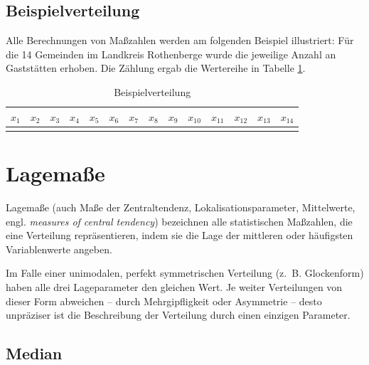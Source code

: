 \documentclass[
  11pt,
  ngerman,
  a4paper,
]{report}
\begin{document}
\hypertarget{beispielverteilung}{%
\subsection{Beispielverteilung}\label{beispielverteilung}}

Alle Berechnungen von Maßzahlen werden am folgenden Beispiel illustriert: Für die 14 Gemeinden im Landkreis Rothenberge wurde die jeweilige Anzahl an Gaststätten erhoben. Die Zählung ergab die Wertereihe in Tabelle \ref{tab:werte}.

\begin{table}

\caption{\label{tab:werte}Beispielverteilung}
\centering
\begin{tabular}[t]{rrrrrrrrrrrrrr}
\toprule
\textbf{$x_{1}$} & \textbf{$x_{2}$} & \textbf{$x_{3}$} & \textbf{$x_{4}$} & \textbf{$x_{5}$} & \textbf{$x_{6}$} & \textbf{$x_{7}$} & \textbf{$x_{8}$} & \textbf{$x_{9}$} & \textbf{$x_{10}$} & \textbf{$x_{11}$} & \textbf{$x_{12}$} & \textbf{$x_{13}$} & \textbf{$x_{14}$}\\
\midrule
\cellcolor{gray!6}{4} & \cellcolor{gray!6}{1} & \cellcolor{gray!6}{4} & \cellcolor{gray!6}{1} & \cellcolor{gray!6}{5} & \cellcolor{gray!6}{5} & \cellcolor{gray!6}{0} & \cellcolor{gray!6}{1} & \cellcolor{gray!6}{8} & \cellcolor{gray!6}{5} & \cellcolor{gray!6}{1} & \cellcolor{gray!6}{25} & \cellcolor{gray!6}{3} & \cellcolor{gray!6}{3}\\
\bottomrule
\end{tabular}
\end{table}

\hypertarget{lagemauxdfe}{%
\section{Lagemaße}\label{lagemauxdfe}}

Lagemaße (auch Maße der Zentraltendenz, Lokalisationsparameter, Mittelwerte, engl. \emph{measures of central tendency}) bezeichnen alle statistischen Maßzahlen, die eine Verteilung repräsentieren, indem sie die Lage der mittleren oder häufigsten Variablenwerte angeben.

Im Falle einer unimodalen, perfekt symmetrischen Verteilung (z.~B. Glockenform) haben alle drei Lageparameter den gleichen Wert. Je weiter Verteilungen von dieser Form abweichen -- durch Mehrgipfligkeit oder Asymmetrie -- desto unpräziser ist die Beschreibung der Verteilung durch einen einzigen Parameter.

\hypertarget{median}{%
\subsection{Median}\label{median}}
\end{document}
